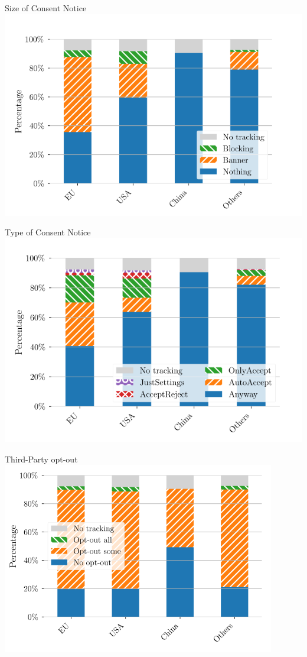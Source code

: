\documentclass[xcolor={dvipsnames}]{beamer}
\begin{document}
\begin{frame}{Size of Consent Notice}
    \centering
    \includegraphics[scale=0.4]{figures/cookie_notice_size_trans.png}
\end{frame}

\begin{frame}{Type of Consent Notice}
    \centering
    \includegraphics[scale=0.4]{figures/cookie_notice_type_trans.png}
\end{frame}

\begin{frame}{Third-Party opt-out}
    \centering
    \includegraphics[scale=0.58]{figures/third_party_trans.png}
\end{frame}
\end{document}
